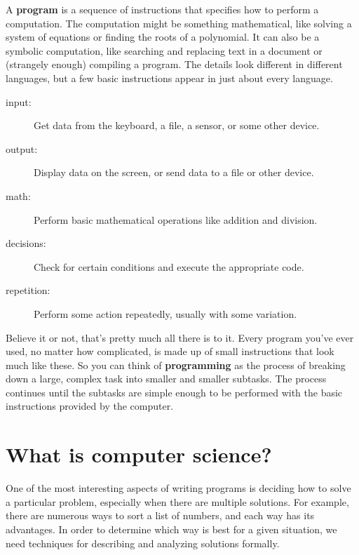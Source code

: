 \documentclass[12pt]{book}
\theoremstyle{exercise}
\begin{document}
A {\bf program} is a sequence of instructions that specifies how to perform a computation.
The computation might be something mathematical, like solving a system of equations or finding the roots of a polynomial.
It can also be a symbolic computation, like searching and replacing text in a document or (strangely enough) compiling a program.
The details look different in different languages, but a few basic instructions appear in just about every language.

\begin{description}
\item[input:] Get data from the keyboard, a file, a sensor, or some other device.
\item[output:] Display data on the screen, or send data to a file or other device.
\item[math:] Perform basic mathematical operations like addition and division.
\item[decisions:] Check for certain conditions and execute the appropriate code.
\item[repetition:] Perform some action repeatedly, usually with some variation.
\end{description}


Believe it or not, that's pretty much all there is to it.
Every program you've ever used, no matter how complicated, is made up of small instructions that look much like these.
So you can think of {\bf programming} as the process of breaking down a large, complex task into smaller and smaller subtasks.
The process continues until the subtasks are simple enough to be performed with the basic instructions provided by the computer.


\section{What is computer science?}

One of the most interesting aspects of writing programs is deciding how to solve a particular problem, especially when there are multiple solutions.
For example, there are numerous ways to sort a list of numbers, and each way has its advantages.
In order to determine which way is best for a given situation, we need techniques for describing and analyzing solutions formally.
\end{document}
